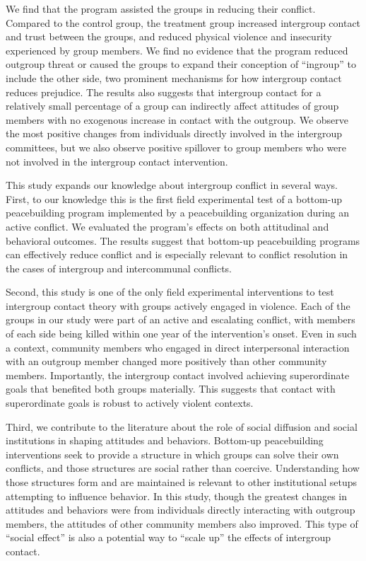 \documentclass[11pt]{article}
\begin{document}
We find that the program assisted the groups in reducing their conflict.
Compared to the control group, the treatment group increased intergroup
contact and trust between the groups, and reduced physical violence and
insecurity experienced by group members. We find no evidence that the
program reduced outgroup threat or caused the groups to expand their
conception of ``ingroup'' to include the other side, two prominent
mechanisms for how intergroup contact reduces prejudice. The results
also suggests that intergroup contact for a relatively small percentage
of a group can indirectly affect attitudes of group members with no
exogenous increase in contact with the outgroup. We observe the most
positive changes from individuals directly involved in the intergroup
committees, but we also observe positive spillover to group members who
were not involved in the intergroup contact intervention.

This study expands our knowledge about intergroup conflict in several
ways. First, to our knowledge this is the first field experimental test
of a bottom-up peacebuilding program implemented by a peacebuilding
organization during an active conflict. We evaluated the program's
effects on both attitudinal and behavioral outcomes. The results suggest
that bottom-up peacebuilding programs can effectively reduce conflict
and is especially relevant to conflict resolution in the cases of
intergroup and intercommunal conflicts.

Second, this study is one of the only field experimental interventions
to test intergroup contact theory with groups actively engaged in
violence. Each of the groups in our study were part of an active and
escalating conflict, with members of each side being killed within one
year of the intervention's onset. Even in such a context, community
members who engaged in direct interpersonal interaction with an outgroup
member changed more positively than other community members.
Importantly, the intergroup contact involved achieving superordinate
goals that benefited both groups materially. This suggests that contact
with superordinate goals is robust to actively violent contexts.

Third, we contribute to the literature about the role of social
diffusion and social institutions in shaping attitudes and behaviors.
Bottom-up peacebuilding interventions seek to provide a structure in
which groups can solve their own conflicts, and those structures are
social rather than coercive. Understanding how those structures form and
are maintained is relevant to other institutional setups attempting to
influence behavior. In this study, though the greatest changes in
attitudes and behaviors were from individuals directly interacting with
outgroup members, the attitudes of other community members also
improved. This type of ``social effect'' is also a potential way to
``scale up'' the effects of intergroup contact.
\end{document}
